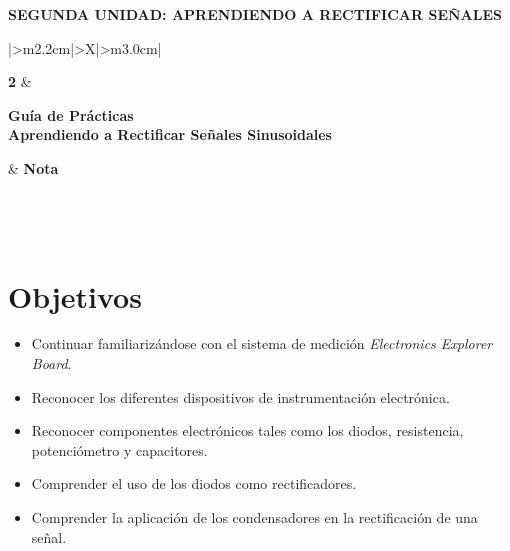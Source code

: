 \documentclass[11pt,a4paper]{article}
\begin{document}
\begin{center}
    {\normalsize\bfseries SEGUNDA UNIDAD: APRENDIENDO A RECTIFICAR SEÑALES}
\end{center}

\vspace{0.55cm}

\begingroup
\renewcommand{\tabularxcolumn}[1]{m{#1}}
\renewcommand{\arraystretch}{2.0}
\setlength{\tabcolsep}{12pt}
\noindent
\begin{tabularx}{\textwidth}{|>{\centering\arraybackslash}m{2.2cm}|>{\centering\arraybackslash}X|>{\centering\arraybackslash}m{3.0cm}|}
\hline
\rule{0pt}{2.1cm}{\fontsize{58}{58}\selectfont\bfseries 2}
    & \begin{minipage}[c]{\linewidth}\centering
          {\large\bfseries Guía de Prácticas}\\[7pt]
          {\Large\bfseries Aprendiendo a Rectificar Señales Sinusoidales}
      \end{minipage}
    & {\Large\bfseries Nota}\\
\hline
{}\\
\hline
{}\\
\\
\hline
\end{tabularx}
\endgroup

\vspace{1.2cm}

\section{Objetivos}
\begin{itemize}
    \item Continuar familiarizándose con el sistema de medición \emph{Electronics Explorer Board}.
    \item Reconocer los diferentes dispositivos de instrumentación electrónica.
    \item Reconocer componentes electrónicos tales como los diodos, resistencia, potenciómetro
          y capacitores.
    \item Comprender el uso de los diodos como rectificadores.
    \item Comprender la aplicación de los condensadores en la rectificación de una señal.
\end{itemize}
\end{document}
